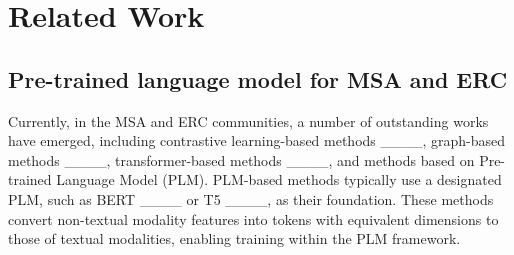 \section{Related Work}
\subsection{Pre-trained language model for MSA and ERC}
	Currently, in the MSA and ERC communities, a number of outstanding works have emerged, including contrastive learning-based methods ____, graph-based methods ____, transformer-based methods ____, and methods based on Pre-trained Language Model (PLM). PLM-based methods typically use a designated PLM, such as BERT ____ or T5 ____, as their foundation. These methods convert non-textual modality features into tokens with equivalent dimensions to those of textual modalities, enabling training within the PLM framework.
	

